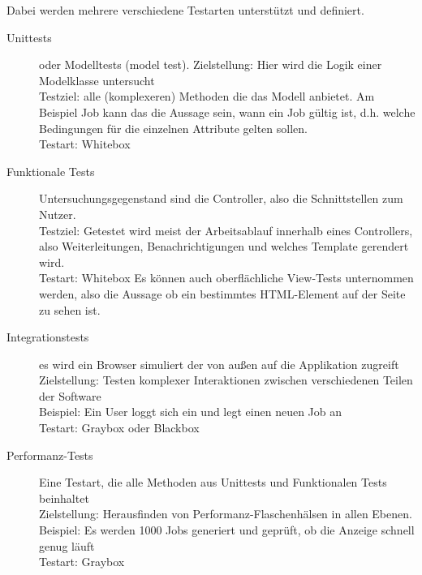 Dabei werden mehrere verschiedene Testarten unterstützt und definiert.
\begin{description}
 \item[Unittests] oder Modelltests (model test). Zielstellung: Hier wird die Logik einer Modelklasse untersucht\\
 Testziel: alle (komplexeren) Methoden die das Modell anbietet. Am Beispiel Job kann das die Aussage sein, wann ein Job gültig ist, d.h. welche Bedingungen für die einzelnen Attribute gelten sollen.\\
 Testart: Whitebox
 \item[Funktionale Tests] Untersuchungsgegenstand sind die Controller, also die Schnittstellen zum Nutzer. \\
 Testziel: Getestet wird meist der Arbeitsablauf innerhalb eines Controllers, also Weiterleitungen, Benachrichtigungen und welches Template gerendert wird.\\
 Testart: Whitebox
 Es können auch oberflächliche View-Tests unternommen werden, also die Aussage ob ein bestimmtes HTML-Element auf der Seite zu sehen ist.
 \item[Integrationstests] es wird ein Browser simuliert der von außen auf die Applikation zugreift
 Zielstellung: Testen komplexer Interaktionen zwischen verschiedenen Teilen der Software\\
 Beispiel: Ein User loggt sich ein und legt einen neuen Job an\\
 Testart: Graybox oder Blackbox
 \item[Performanz-Tests] Eine Testart, die alle Methoden aus Unittests und Funktionalen Tests beinhaltet\\
 Zielstellung: Herausfinden von Performanz-Flaschenhälsen in allen Ebenen. \\
 Beispiel: Es werden 1000 Jobs generiert und geprüft, ob die Anzeige schnell genug läuft\\
 Testart: Graybox
\end{description}
